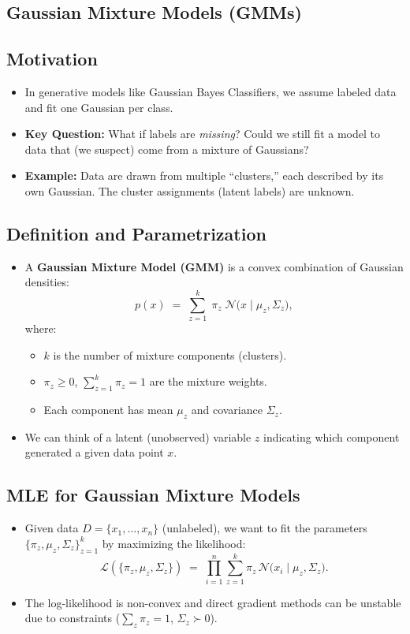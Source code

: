 \documentclass[twocolumn]{article}
\begin{document}
\begin{spacing}{1}
\section{Gaussian Mixture Models (GMMs)}

\subsection{Motivation}
\begin{itemize}
    \item In generative models like Gaussian Bayes Classifiers, we assume labeled data and fit one Gaussian per class. 
    \item \textbf{Key Question:} What if labels are \emph{missing}? Could we still fit a model to data that (we suspect) come from a mixture of Gaussians?
    \item \textbf{Example:} Data are drawn from multiple “clusters,” each described by its own Gaussian. The cluster assignments (latent labels) are unknown.
\end{itemize}

\subsection{Definition and Parametrization}
\begin{itemize}
    \item A \textbf{Gaussian Mixture Model (GMM)} is a convex combination of Gaussian densities:
    \[
        p(x) \;=\; \sum_{z=1}^k \;\pi_z \;\mathcal{N}\bigl(x \mid \mu_z,\Sigma_z\bigr),
    \]
    where:
    \begin{itemize}
        \item $k$ is the number of mixture components (clusters).
        \item $\pi_z \geq 0$, $\sum_{z=1}^k \pi_z = 1$ are the mixture weights.
        \item Each component has mean $\mu_z$ and covariance $\Sigma_z$.
    \end{itemize}
    \item We can think of a latent (unobserved) variable $z$ indicating which component generated a given data point $x$.
\end{itemize}

\subsection{MLE for Gaussian Mixture Models}
\begin{itemize}
    \item Given data $D = \{x_1, \dots, x_n\}$ (unlabeled), we want to fit the parameters $\{\pi_z, \mu_z, \Sigma_z\}_{z=1}^k$ by maximizing the likelihood:
    \[
        \mathcal{L}(\{\pi_z,\mu_z,\Sigma_z\}) 
        \;=\;
        \prod_{i=1}^n \sum_{z=1}^k \pi_z \,\mathcal{N}\bigl(x_i \mid \mu_z,\Sigma_z\bigr).
    \]
    \item The log-likelihood is non-convex and direct gradient methods can be unstable due to constraints ($\sum_z \pi_z=1$, $\Sigma_z \succ 0$).
\end{itemize}


\end{spacing}
\end{document}
